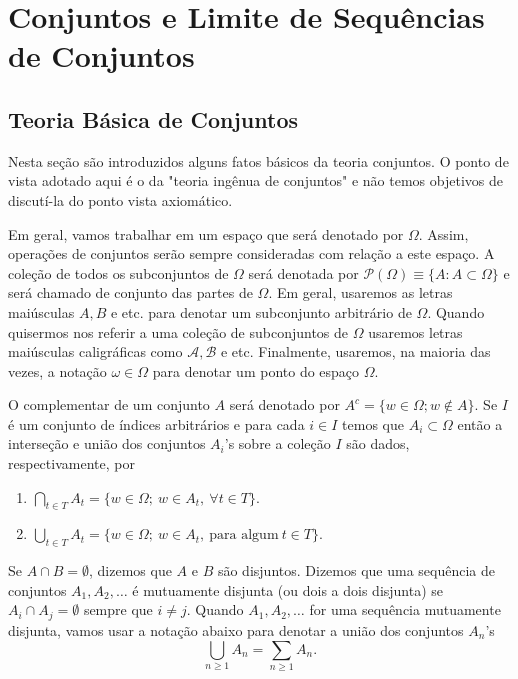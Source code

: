 \chapter[Aula 1]{Conjuntos e Limite de Sequências de Conjuntos}
\chaptermark{}

  
\section{Teoria Básica de Conjuntos}

Nesta seção são introduzidos alguns fatos básicos da teoria
conjuntos. O ponto de vista adotado aqui é o da "teoria ingênua
de conjuntos" e não temos objetivos de discutí-la do ponto 
vista axiomático.


Em geral, vamos trabalhar em um espaço que será denotado 
por $\Omega$. Assim, operações de conjuntos serão sempre 
consideradas com relação a este espaço. 
A coleção de todos os subconjuntos de $\Omega$ será 
denotada por $\mathcal{P}(\Omega)\equiv \{A: A\subset \Omega\}$ e 
será chamado de conjunto das partes de $\Omega$.
Em geral, usaremos as letras maiúsculas $A,B$ e etc. para denotar
um subconjunto arbitrário de $\Omega$. Quando quisermos nos referir
a uma coleção de subconjuntos de $\Omega$ usaremos letras maiúsculas 
caligráficas como $\mathcal{A}, \mathcal{B}$ e etc. Finalmente,
usaremos, na maioria das vezes, a notação $\omega\in\Omega$ 
para denotar um ponto do espaço $\Omega$.



O complementar de um conjunto $A$ será 
denotado por $A^{c}= \{w \in \Omega; w \notin A\}$. 
Se $I$ é um conjunto de índices arbitrários e 
para cada $i\in I$ temos que $A_i\subset \Omega$ então 
a interseção e união dos conjuntos $A_i$'s sobre a coleção
$I$ são dados, respectivamente, por 
\begin{enumerate}
	\item[]  $\displaystyle\bigcap_{t \in T}{A_t}
							= 
						\{ w \in \Omega;\ w \in A_t,\ \forall t \in T\}$.
	\item[]  $\displaystyle\bigcup_{t \in T}{A_t}
							= 
						\{ w \in \Omega;\ w \in A_t,\ \text{para algum}\ t \in T \}$.
\end{enumerate}
%
%
%
Se $A \cap B = \emptyset$, dizemos que $A$ e $B$ são disjuntos.
Dizemos que uma sequência de conjuntos 
$A_1, A_2,\ldots$ é mutuamente disjunta (ou dois a dois disjunta) 
se $A_i \cap A_j = \emptyset$ sempre que $i \neq j$. 
Quando $A_1,A_2,\ldots $ for uma sequência mutuamente disjunta, 
vamos usar a notação abaixo para denotar a união dos conjuntos $A_n$'s
\[
	\displaystyle\bigcup_{n \geqslant 1}{A_n} = \sum_{n \geqslant 1} A_n.	
\]

